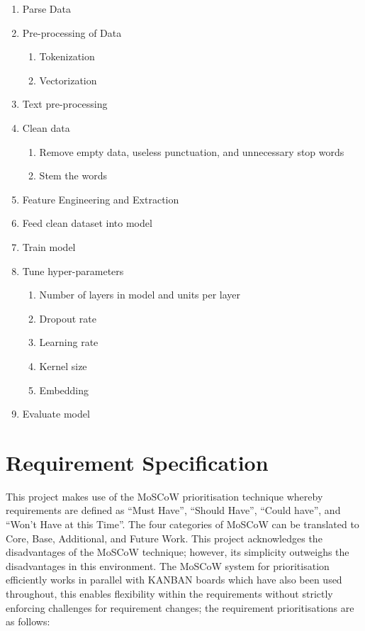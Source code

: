 \begin{enumerate}
    \item Parse Data
    \item Pre-processing of Data
    \begin{enumerate}
        \item Tokenization
        \item Vectorization
    \end{enumerate}
\item Text pre-processing
\item Clean data
    \begin{enumerate}
        \item Remove empty data, useless punctuation, and unnecessary stop words
        \item Stem the words
    \end{enumerate}
\item Feature Engineering and Extraction
\item Feed clean dataset into model
\item Train model
\item Tune hyper-parameters
    \begin{enumerate}
        \item Number of layers in model and units per layer
        \item Dropout rate
        \item Learning rate
        \item Kernel size
        \item Embedding
    \end{enumerate}
\item Evaluate model
\end{enumerate}

\section{Requirement Specification}

This project makes use of the MoSCoW prioritisation technique whereby requirements are defined as “Must Have”, “Should Have”, “Could have”, and “Won’t Have at this Time”. The four categories of MoSCoW can be translated to Core, Base, Additional, and Future Work. This project acknowledges the disadvantages of the MoSCoW technique; however, its simplicity outweighs the disadvantages in this environment. The MoSCoW system for prioritisation efficiently works in parallel with KANBAN boards which have also been used throughout, this enables flexibility within the requirements without strictly enforcing challenges for requirement changes; the requirement prioritisations are as follows:

